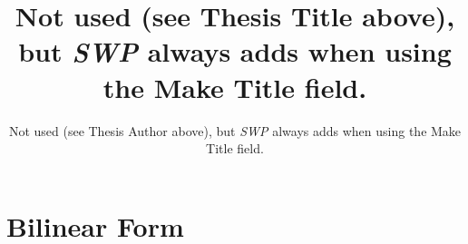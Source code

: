 \documentclass{unswthesis}
\begin{document}
\thesisdate{}
\thesisassessor{}
\title{Not used (see Thesis Title above), but \textsl{SWP} always adds when
using the Make Title field.}
\author{Not used (see Thesis Author above), but \textsl{SWP} always adds
when using the Make Title field.}
\maketitle
\tableofcontents
\listoffigures
\listoftables

\chapter{Bilinear Form}
\end{document}
